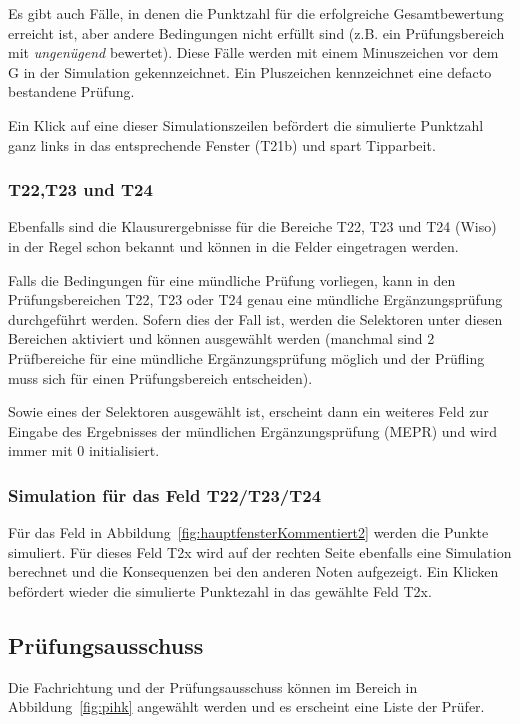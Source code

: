 \documentclass[a4paper,notitlepage,parskip=half]{scrartcl}
\newcommand*\circled[1]{\tikz[baseline=(char.base)]{
            \node[shape=circle,draw,inner sep=2pt] (char) {#1};}}
\begin{document}
Es gibt auch Fälle, in denen die Punktzahl für die erfolgreiche Gesamtbewertung erreicht ist, aber andere Bedingungen nicht erfüllt sind (z.B. ein Prüfungsbereich mit \emph{ungenügend} bewertet). Diese Fälle werden mit einem Minuszeichen vor dem G in der Simulation gekennzeichnet. Ein Pluszeichen kennzeichnet eine defacto bestandene Prüfung.

Ein Klick auf eine dieser Simulationszeilen befördert die simulierte Punktzahl ganz links in das entsprechende Fenster (T21b) und spart Tipparbeit.
 
\subsubsection*{T22,T23 und T24}
Ebenfalls sind die Klausurergebnisse für die Bereiche T22, T23 und T24 (Wiso) in der Regel schon bekannt und können in die Felder eingetragen werden. 

Falls die Bedingungen für eine mündliche Prüfung vorliegen, kann in den Prüfungsbereichen T22, T23 oder T24 genau eine mündliche Ergänzungsprüfung durchgeführt werden. Sofern dies der Fall ist, werden die Selektoren unter diesen Bereichen aktiviert und können ausgewählt werden (manchmal sind 2 Prüfbereiche für eine mündliche Ergänzungsprüfung möglich und der Prüfling muss sich für einen Prüfungsbereich entscheiden).

Sowie eines der Selektoren ausgewählt ist, erscheint dann ein weiteres Feld zur Eingabe des Ergebnisses der mündlichen Ergänzungsprüfung (MEPR) und wird immer mit 0 initialisiert.

\subsubsection*{Simulation für das Feld T22/T23/T24}
Für das Feld \circled{2} in Abbildung~\ref{fig:hauptfensterKommentiert2} werden die Punkte simuliert.
Für dieses Feld T2x wird auf der rechten Seite ebenfalls eine Simulation berechnet und die Konsequenzen bei den anderen Noten aufgezeigt. Ein Klicken befördert wieder die simulierte Punktezahl in das gewählte Feld T2x.

\subsection{Prüfungsausschuss}
Die Fachrichtung und der Prüfungsausschuss können im Bereich \circled{C} in Abbildung~\ref{fig:pihk} angewählt werden und es erscheint eine Liste der Prüfer.
\end{document}
